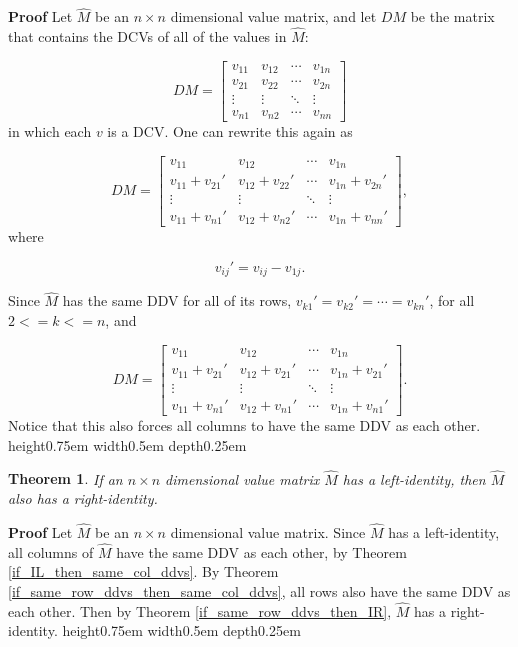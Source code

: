 \documentclass[10pt,letterpaper]{article}
\newtheorem{thm}{Theorem}[section]
\newenvironment{proof}{\noindent\textbf{Proof} }{\qed \newline}
\newcommand{\qed}{\nobreak \ifvmode \relax \else
      \ifdim\lastskip<1.5em \hskip-\lastskip
      \hskip1.5em plus0em minus0.5em \fi \nobreak
      \vrule height0.75em width0.5em depth0.25em\fi}
\numberwithin{equation}{section}
\begin{document}
\begin{proof}Let $\hat M$ be an $n \times n$ dimensional value
  matrix, and let $DM$ be the matrix that contains the DCVs of all
  of the values in $\hat M$:

\[ DM = \left[ \begin{matrix} 
  v_{11} & v_{12} & \cdots & v_{1n} \\
  v_{21} & v_{22} & \cdots & v_{2n} \\
  \vdots & \vdots & \ddots & \vdots \\
  v_{n1} & v_{n2} & \cdots & v_{nn}
\end{matrix} \right] \] in which each $v$ is a DCV.  One can rewrite
this again as

\[ DM = \left[ \begin{matrix} 
  v_{11} & v_{12} & \cdots & v_{1n} \\
  v_{11} + v_{21} \prime & v_{12} + v_{22} \prime & \cdots & v_{1n} + v_{2n} \prime \\
  \vdots & \vdots & \ddots & \vdots \\
  v_{11} + v_{n1} \prime & v_{12} + v_{n2} \prime & \cdots & v_{1n} + v_{nn} \prime
 \end{matrix} \right] , \] where

\[ v_{ij} \prime = v_{ij} - v_{1j} . \]

Since $\hat M$ has the same DDV for all of its rows, $v_{k1} \prime
= v_{k2} \prime = \cdots = v_{kn} \prime$, for all $2 <= k <= n$, and

\[ DM = \left[ \begin{matrix} 
  v_{11} & v_{12} & \cdots & v_{1n} \\
  v_{11} + v_{21} \prime & v_{12} + v_{21} \prime & \cdots & v_{1n} + v_{21} \prime \\
  \vdots & \vdots & \ddots & \vdots \\
  v_{11} + v_{n1} \prime & v_{12} + v_{n1} \prime & \cdots & v_{1n} + v_{n1} \prime
\end{matrix} \right] . \] Notice that this also forces all columns to
have the same DDV as each other.  \end{proof}

\begin{thm}If an $n \times n$ dimensional value matrix $\hat M$  has a
  left-identity, then $\hat M$ also has a right-identity.\end{thm}

\begin{proof}Let $\hat M$ be an $n \times n$ dimensional value matrix.
  Since $\hat M$ has a left-identity, all columns of $\hat M$ have the
  same DDV as each other, by Theorem \ref{if_IL_then_same_col_ddvs}.
  By Theorem \ref{if_same_row_ddvs_then_same_col_ddvs}, all rows also
  have the same DDV as each other.  Then by Theorem
  \ref{if_same_row_ddvs_then_IR}, $\hat M$ has a right-identity.  \end{proof}
\end{document}
